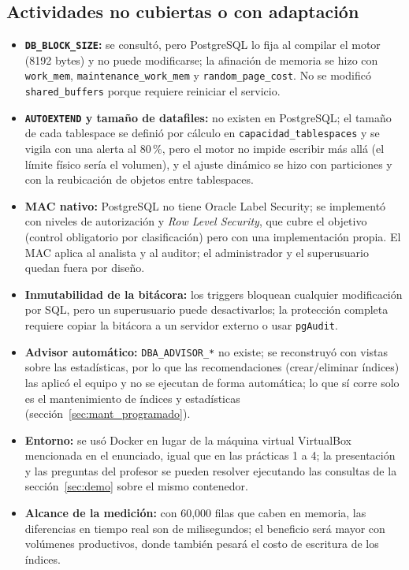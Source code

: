 \documentclass[12pt,a4paper]{article}
\begin{document}
\subsection{Actividades no cubiertas o con adaptación}

\begin{itemize}
    \item \textbf{\texttt{DB\_\allowbreak{}BLOCK\_\allowbreak{}SIZE}:} se consultó, pero PostgreSQL lo fija al compilar el motor (8192 bytes) y no puede modificarse; la afinación de memoria se hizo con \texttt{work\_\allowbreak{}mem}, \texttt{maintenance\_\allowbreak{}work\_\allowbreak{}mem} y \texttt{random\_\allowbreak{}page\_\allowbreak{}cost}. No se modificó \texttt{shared\_\allowbreak{}buffers} porque requiere reiniciar el servicio.
    \item \textbf{\texttt{AUTOEXTEND} y tamaño de datafiles:} no existen en PostgreSQL; el tamaño de cada tablespace se definió por cálculo en \texttt{capacidad\_\allowbreak{}tablespaces} y se vigila con una alerta al 80\,\%, pero el motor no impide escribir más allá (el límite físico sería el volumen), y el ajuste dinámico se hizo con particiones y con la reubicación de objetos entre tablespaces.
    \item \textbf{MAC nativo:} PostgreSQL no tiene Oracle Label Security; se implementó con niveles de autorización y \textit{Row Level Security}, que cubre el objetivo (control obligatorio por clasificación) pero con una implementación propia. El MAC aplica al analista y al auditor; el administrador y el superusuario quedan fuera por diseño.
    \item \textbf{Inmutabilidad de la bitácora:} los triggers bloquean cualquier modificación por SQL, pero un superusuario puede desactivarlos; la protección completa requiere copiar la bitácora a un servidor externo o usar \texttt{pgAudit}.
    \item \textbf{Advisor automático:} \texttt{DBA\_\allowbreak{}ADVISOR\_\allowbreak{}*} no existe; se reconstruyó con vistas sobre las estadísticas, por lo que las recomendaciones (crear/eliminar índices) las aplicó el equipo y no se ejecutan de forma automática; lo que sí corre solo es el mantenimiento de índices y estadísticas (sección~\ref{sec:mant_programado}).
    \item \textbf{Entorno:} se usó Docker en lugar de la máquina virtual VirtualBox mencionada en el enunciado, igual que en las prácticas 1 a 4; la presentación y las preguntas del profesor se pueden resolver ejecutando las consultas de la sección~\ref{sec:demo} sobre el mismo contenedor.
    \item \textbf{Alcance de la medición:} con 60,000 filas que caben en memoria, las diferencias en tiempo real son de milisegundos; el beneficio será mayor con volúmenes productivos, donde también pesará el costo de escritura de los índices.
\end{itemize}
\end{document}
